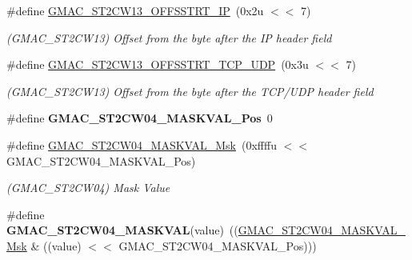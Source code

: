 \begin{DoxyCompactItemize}
\mbox{\label{group__SAMV71__GMAC_gaa825c8362a8d863f032e26f6b0157c77}} 
\#define \mbox{\hyperlink{group__SAMV71__GMAC_gaa825c8362a8d863f032e26f6b0157c77}{G\+M\+A\+C\+\_\+\+S\+T2\+C\+W13\+\_\+\+O\+F\+F\+S\+S\+T\+R\+T\+\_\+\+IP}}~(0x2u $<$$<$ 7)
\begin{DoxyCompactList}\small\item\em (G\+M\+A\+C\+\_\+\+S\+T2\+C\+W13) Offset from the byte after the IP header field \end{DoxyCompactList}\item 
\mbox{\label{group__SAMV71__GMAC_gad6e915af3f9b558846d6e4d4531a4db7}} 
\#define \mbox{\hyperlink{group__SAMV71__GMAC_gad6e915af3f9b558846d6e4d4531a4db7}{G\+M\+A\+C\+\_\+\+S\+T2\+C\+W13\+\_\+\+O\+F\+F\+S\+S\+T\+R\+T\+\_\+\+T\+C\+P\+\_\+\+U\+DP}}~(0x3u $<$$<$ 7)
\begin{DoxyCompactList}\small\item\em (G\+M\+A\+C\+\_\+\+S\+T2\+C\+W13) Offset from the byte after the T\+C\+P/\+U\+DP header field \end{DoxyCompactList}\item 
\mbox{\label{group__SAMV71__GMAC_ga46394ab46ee07c863cbca88efebf0354}} 
\#define {\bfseries G\+M\+A\+C\+\_\+\+S\+T2\+C\+W04\+\_\+\+M\+A\+S\+K\+V\+A\+L\+\_\+\+Pos}~0
\item 
\mbox{\label{group__SAMV71__GMAC_ga4394077d563ce8a66f566e49b3370d14}} 
\#define \mbox{\hyperlink{group__SAMV71__GMAC_ga4394077d563ce8a66f566e49b3370d14}{G\+M\+A\+C\+\_\+\+S\+T2\+C\+W04\+\_\+\+M\+A\+S\+K\+V\+A\+L\+\_\+\+Msk}}~(0xffffu $<$$<$ G\+M\+A\+C\+\_\+\+S\+T2\+C\+W04\+\_\+\+M\+A\+S\+K\+V\+A\+L\+\_\+\+Pos)
\begin{DoxyCompactList}\small\item\em (G\+M\+A\+C\+\_\+\+S\+T2\+C\+W04) Mask Value \end{DoxyCompactList}\item 
\mbox{\label{group__SAMV71__GMAC_ga77a548f54616a0c94acf93e1614e2536}} 
\#define {\bfseries G\+M\+A\+C\+\_\+\+S\+T2\+C\+W04\+\_\+\+M\+A\+S\+K\+V\+AL}(value)~((\mbox{\hyperlink{group__SAMV71__GMAC_ga4394077d563ce8a66f566e49b3370d14}{G\+M\+A\+C\+\_\+\+S\+T2\+C\+W04\+\_\+\+M\+A\+S\+K\+V\+A\+L\+\_\+\+Msk}} \& ((value) $<$$<$ G\+M\+A\+C\+\_\+\+S\+T2\+C\+W04\+\_\+\+M\+A\+S\+K\+V\+A\+L\+\_\+\+Pos)))

\end{DoxyCompactItemize}
